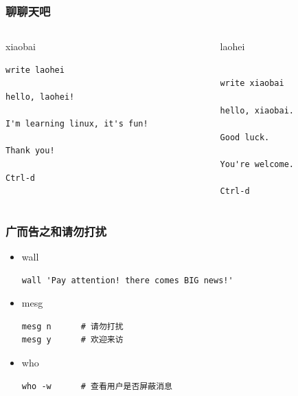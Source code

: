 \documentclass[xcolor=svgnames,presentation]{beamer}
\begin{document}
\begin{frame}[fragile]
\frametitle{聊聊天吧}
\label{sec-4-2-17}
\begin{columns}
\begin{column}{0.5\textwidth}
\begin{block}{xiaobai}
\label{sec-4-2-17-1}


\begin{verbatim}
write laohei

hello, laohei!

I'm learning linux, it's fun!

Thank you!

Ctrl-d
　
\end{verbatim}
\end{block}
\end{column}
\begin{column}{0.5\textwidth}
\begin{exampleblock}{laohei}
\label{sec-4-2-17-2}


\begin{verbatim}

write xiaobai

hello, xiaobai.

Good luck.

You're welcome.

Ctrl-d
\end{verbatim}
\end{exampleblock}
\end{column}
\end{columns}
\end{frame}
\begin{frame}[fragile]
\frametitle{广而告之和请勿打扰}
\label{sec-4-2-18}
\begin{itemize}

\item wall\\
\label{sec-4-2-18-1}%
\begin{verbatim}
wall 'Pay attention! there comes BIG news!'
\end{verbatim}

\item mesg\\
\label{sec-4-2-18-2}%
\begin{verbatim}
mesg n      # 请勿打扰
mesg y      # 欢迎来访
\end{verbatim}

\item who\\
\label{sec-4-2-18-3}%
\begin{verbatim}
who -w      # 查看用户是否屏蔽消息
\end{verbatim}
\end{itemize} %
\end{frame}
\end{document}
